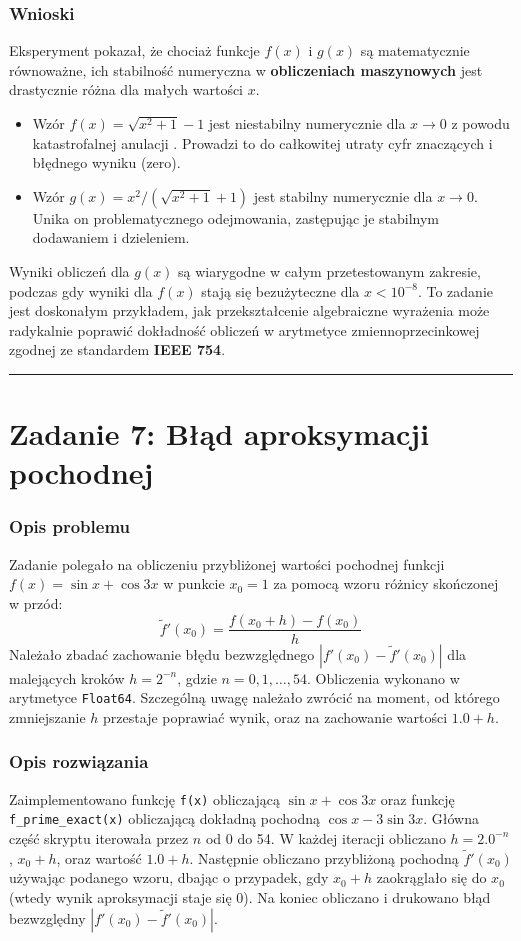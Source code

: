 \documentclass[11pt, a4paper]{article}
\newcommand{\taskseparator}{\leavevmode\leaders\hrule height 0.5pt\hfill\kern0pt}
\begin{document}
\subsubsection{Wnioski}
Eksperyment pokazał, że chociaż funkcje $f(x)$ i $g(x)$ są matematycznie równoważne, ich  stabilność numeryczna  w \textbf{obliczeniach maszynowych} jest drastycznie różna dla małych wartości $x$.
\begin{itemize}
    \item Wzór $f(x) = \sqrt{x^2+1} - 1$ jest  niestabilny numerycznie  dla $x \to 0$ z powodu  katastrofalnej anulacji . Prowadzi to do całkowitej utraty cyfr znaczących i błędnego wyniku (zero).
    \item Wzór $g(x) = x^2 / (\sqrt{x^2+1} + 1)$ jest  stabilny numerycznie  dla $x \to 0$. Unika on problematycznego odejmowania, zastępując je stabilnym dodawaniem i dzieleniem.
\end{itemize}
Wyniki obliczeń dla $g(x)$ są wiarygodne w całym przetestowanym zakresie, podczas gdy wyniki dla $f(x)$ stają się bezużyteczne dla $x < 10^{-8}$. To zadanie jest doskonałym przykładem, jak przekształcenie algebraiczne wyrażenia może radykalnie poprawić dokładność obliczeń w arytmetyce zmiennoprzecinkowej zgodnej ze standardem \textbf{IEEE 754}.

\taskseparator

\section{Zadanie 7: Błąd aproksymacji pochodnej}

\subsubsection{Opis problemu}
Zadanie polegało na obliczeniu przybliżonej wartości pochodnej funkcji $f(x) = \sin x + \cos 3x$ w punkcie $x_0 = 1$ za pomocą wzoru różnicy skończonej w przód:
\[
    \tilde{f}'(x_0) = \frac{f(x_0 + h) - f(x_0)}{h}
\]
Należało zbadać zachowanie błędu bezwzględnego $|f'(x_0) - \tilde{f}'(x_0)|$ dla malejących kroków $h = 2^{-n}$, gdzie $n = 0, 1, \dots, 54$. Obliczenia wykonano w arytmetyce \texttt{Float64}. Szczególną uwagę należało zwrócić na moment, od którego zmniejszanie $h$ przestaje poprawiać wynik, oraz na zachowanie wartości $1.0 + h$.

\subsubsection{Opis rozwiązania}
Zaimplementowano funkcję \texttt{f(x)} obliczającą $\sin x + \cos 3x$ oraz funkcję \texttt{f\_prime\_exact(x)} obliczającą dokładną pochodną $\cos x - 3\sin 3x$. Główna część skryptu iterowała przez $n$ od 0 do 54. W każdej iteracji obliczano $h = 2.0^{-n}$, $x_0 + h$, oraz wartość $1.0 + h$. Następnie obliczano przybliżoną pochodną $\tilde{f}'(x_0)$ używając podanego wzoru, dbając o przypadek, gdy $x_0+h$ zaokrąglało się do $x_0$ (wtedy wynik aproksymacji staje się 0). Na koniec obliczano i drukowano błąd bezwzględny $|f'(x_0) - \tilde{f}'(x_0)|$.
\end{document}
